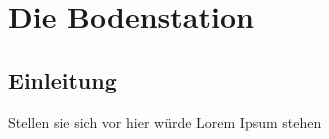 \section{Die Bodenstation}
\subsection{Einleitung}
Stellen sie sich vor hier würde Lorem Ipsum stehen